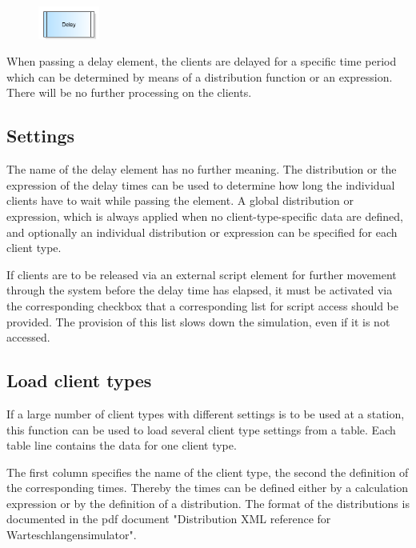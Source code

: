\begin{figure}
\vspace{-22pt}
\includegraphics[width=2cm]{imageModelElementDelay.png}
\vspace{-22pt}
\end{figure}

When passing a delay element, the clients are delayed for a specific time period which can be determined
 by means of a distribution function or an expression. There will be no further processing on the clients.

\subsection*{Settings}

The name of the delay element has no further meaning. The distribution or the expression of the delay times can be used
to determine how long the individual clients have to wait while passing the element. A global distribution or expression,
which is always applied when no client-type-specific data are defined, and optionally an individual distribution or expression
can be specified for each client type.

If clients are to be released via an external script element for further movement through the system before the delay time has elapsed,
it must be activated via the corresponding checkbox that a corresponding list for script access should be provided. The provision of
this list slows down the simulation, even if it is not accessed.

\subsection*{Load client types}

If a large number of client types with different settings is to be used at a station, this function can be used
to load several client type settings from a table. Each table line contains the data for one client type.

The first column specifies the name of the client type, the second the definition of the corresponding times.
Thereby the times can be defined either by a calculation expression or by the definition of a
distribution. The format of the distributions is documented in the pdf document
"Distribution XML reference for Warteschlangensimulator".


